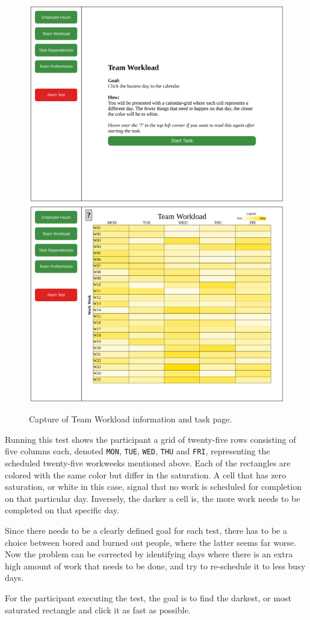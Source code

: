 {    \begin{figure}[h!]
      \centering
      \includegraphics[width=.49\textwidth]{figures/captures/webapp_team_workload_info.pdf}
      \includegraphics[width=.49\textwidth]{figures/captures/webapp_team_workload_task.pdf}
      \caption{Capture of Team Workload information and task page.}
    \end{figure}

    Running this test shows the participant a grid of twenty-five rows
    consisting of five columns each, denoted
    \texttt{MON},
    \texttt{TUE},
    \texttt{WED},
    \texttt{THU} and
    \texttt{FRI},
    representing the scheduled twenty-five workweeks mentioned above. Each
    of the rectangles are colored with the same color but differ in the
    saturation. A cell that has zero saturation, or white in this case,
    signal that no work is scheduled for completion on that particular day.
    Inversely, the darker a cell is, the more work needs to be completed on
    that specific day.

    Since there needs to be a clearly defined goal for each test, there has
    to be a choice between bored and burned out people, where the latter
    seems far worse. Now the problem can be corrected by identifying days
    where there is an extra high amount of work that needs to be done, and
    try to re-schedule it to less busy days.

    For the participant executing the test, the goal is to find the
    darkest, or most saturated rectangle and click it as fast as possible.

}
